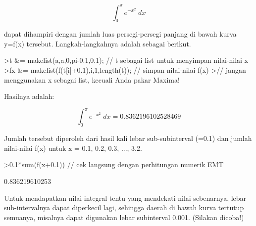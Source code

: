 \documentclass[a4paper,10pt]{article}
\begin{document}
\begin{eulernotebook}
\begin{eulercomment}
\begin{eulercomment}
\begin{eulercomment}
\begin{eulercomment}
\begin{eulercomment}
\begin{eulercomment}
\begin{eulercomment}
\begin{eulercomment}
\begin{eulercomment}
\begin{eulercomment}
\begin{eulercomment}
\end{eulercomment}
\begin{eulerformula}
\[
\int_{0}^{\pi}{e^ {- x^2 }\;dx}
\]
\end{eulerformula}
\begin{eulercomment}
dapat dihampiri dengan jumlah luas persegi-persegi panjang di bawah
kurva y=f(x) tersebut. Langkah-langkahnya adalah sebagai berikut.
\end{eulercomment}
\begin{eulerprompt}
>t &= makelist(a,a,0,pi-0.1,0.1); // t sebagai list untuk menyimpan nilai-nilai x
>fx &= makelist(f(t[i]+0.1),i,1,length(t)); // simpan nilai-nilai f(x)
>// jangan menggunakan x sebagai list, kecuali Anda pakar Maxima!
\end{eulerprompt}
\begin{eulercomment}
Hasilnya adalah:

\end{eulercomment}
\begin{eulerformula}
\[
\int_{0}^{\pi}{e^ {- x^2 }\;dx}=0.8362196102528469
\]
\end{eulerformula}
\begin{eulercomment}
Jumlah tersebut diperoleh dari hasil kali lebar sub-subinterval (=0.1)
dan jumlah nilai-nilai f(x) untuk x = 0.1, 0.2, 0.3, ..., 3.2.
\end{eulercomment}
\begin{eulerprompt}
>0.1*sum(f(x+0.1)) // cek langsung dengan perhitungan numerik EMT
\end{eulerprompt}
\begin{euleroutput}
  0.836219610253
\end{euleroutput}
\begin{eulercomment}
Untuk mendapatkan nilai integral tentu yang mendekati nilai
sebenarnya, lebar sub-intervalnya dapat diperkecil lagi, sehingga
daerah di bawah kurva tertutup semuanya, misalnya dapat digunakan
lebar subinterval 0.001. (Silakan dicoba!)


\end{eulercomment}
\end{eulercomment}
\end{eulercomment}
\end{eulercomment}
\end{eulercomment}
\end{eulercomment}
\end{eulercomment}
\end{eulercomment}
\end{eulercomment}
\end{eulercomment}
\end{eulercomment}
\end{eulernotebook}
\end{document}
